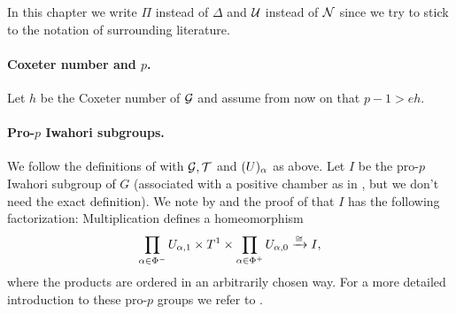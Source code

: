 \begin{remark}
  In this chapter we write $\Pi$ instead of $\Delta$ and $\mathcal{U}$ instead of $\mathcal{N}$ since we try to stick to the notation of surrounding literature.
\end{remark}

\paragraph{Coxeter number and $p$.} Let $h$ be the Coxeter number of $\mathcal{G}$ and assume from now on that $p-1 > eh$.


\paragraph{Pro-$p$ Iwahori subgroups.} We follow the definitions of \cite{SchOll-modular} with $\mathcal{G}, \mathcal{T}$ and $\mathcal{(}U)_{\alpha}$ as above. Let $I$ be the pro-$p$ Iwahori subgroup of $G$ (associated with a positive chamber as in \cite{SchOll-modular}, but we don't need the exact definition). We note by \cite[Lem.~2.1(i)]{SchOll-modular} and the proof of \cite[Lem.~2.3]{SchOll-modular} that $I$ has the following factorization: Multiplication defines a homeomorphism
\begin{equation*}
  \prod_{\alpha \in \Phi^{-}} U_{\alpha,1} \times T^{1} \times \prod_{\alpha \in \Phi^{+}} U_{\alpha,0} \xrightarrow{\cong} I,
\end{equation*}
where the products are ordered in an arbitrarily chosen way. For a more detailed introduction to these pro-$p$ groups we refer to \cite{SchOll-modular}.

